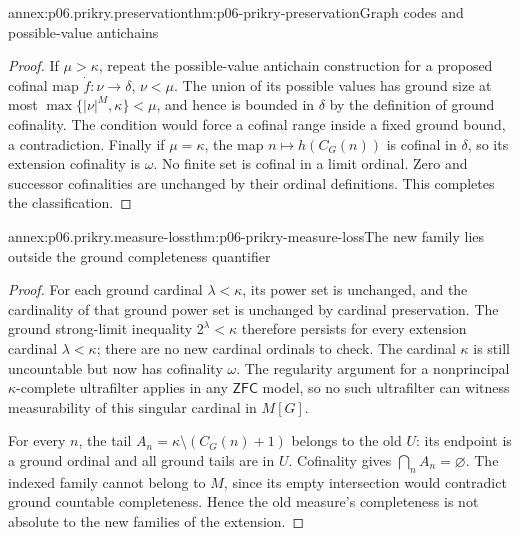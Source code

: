 \begin{annexitem}{annex:p06.prikry.preservation}{thm:p06-prikry-preservation}{Graph codes and possible-value antichains}
\begin{proof}
If \(\mu>\kappa\), repeat the possible-value antichain construction
for a proposed cofinal map \(\dot f:\nu\to\delta\), \(\nu<\mu\).
The union of its possible values has ground size at most
\(\max\{|\nu|^M,\kappa\}<\mu\), and hence is bounded in \(\delta\)
by the definition of ground cofinality. The condition would force a
cofinal range inside a fixed ground bound, a contradiction. Finally if
\(\mu=\kappa\), the map \(n\mapsto h(C_G(n))\) is cofinal in
\(\delta\), so its extension cofinality is \(\omega\). No finite set
is cofinal in a limit ordinal. Zero and successor cofinalities are
unchanged by their ordinal definitions. This completes the classification.
\end{proof}
\end{annexitem}

\begin{annexitem}{annex:p06.prikry.measure-loss}{thm:p06-prikry-measure-loss}{The new family lies outside the ground completeness quantifier}
\begin{proof}
For each ground cardinal \(\lambda<\kappa\), its power set is unchanged,
and the cardinality of that ground power set is unchanged by cardinal
preservation. The ground strong-limit inequality
\(2^\lambda<\kappa\) therefore persists for every extension cardinal
\(\lambda<\kappa\); there are no new cardinal ordinals to check.
The cardinal \(\kappa\) is still uncountable but now has cofinality
\(\omega\). The regularity argument for a nonprincipal
\(\kappa\)-complete ultrafilter applies in any \(\mathsf{ZFC}\) model,
so no such ultrafilter can witness measurability of this singular cardinal
in \(M[G]\).

For every \(n\), the tail \(A_n=\kappa\setminus(C_G(n)+1)\) belongs
to the old \(U\): its endpoint is a ground ordinal and all ground tails
are in \(U\). Cofinality gives \(\bigcap_nA_n=\varnothing\).
The indexed family cannot belong to \(M\), since its empty intersection
would contradict ground countable completeness. Hence the old measure's
completeness is not absolute to the new families of the extension.
\end{proof}
\end{annexitem}

